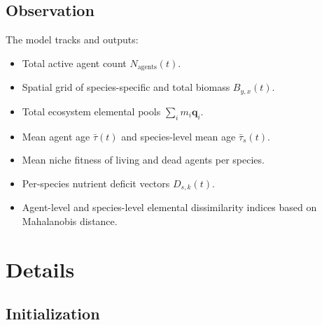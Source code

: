 \documentclass[11pt,a4paper]{article}
\begin{document}
\subsection{Observation}
The model tracks and outputs:
\begin{itemize}
    \item Total active agent count $N_{\text{agents}}(t)$.
    \item Spatial grid of species-specific and total biomass $B_{y,x}(t)$.
    \item Total ecosystem elemental pools $\sum_{i} m_i \boldsymbol{q}_i$.
    \item Mean agent age $\bar{\tau}(t)$ and species-level mean age $\bar{\tau}_s(t)$.
    \item Mean niche fitness of living and dead agents per species.
    \item Per-species nutrient deficit vectors $D_{s, k}(t)$.
    \item Agent-level and species-level elemental dissimilarity indices based on Mahalanobis distance.
\end{itemize}

\section{Details}

\subsection{Initialization}
\end{document}
